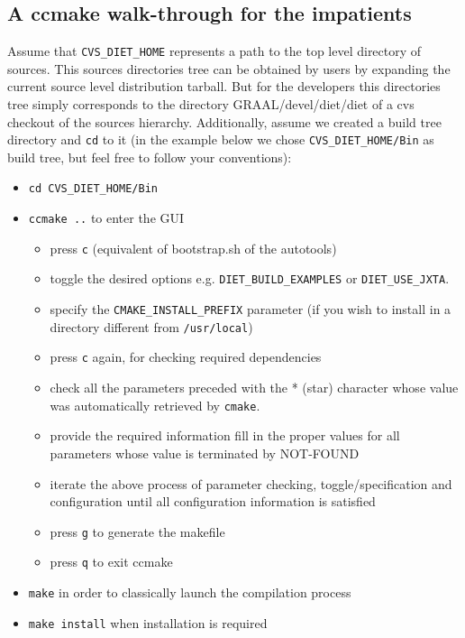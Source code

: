 \subsection{A ccmake walk-through for the impatients}

Assume that \verb+CVS_DIET_HOME+ represents a path to the top level directory
of \diet sources.  This \diet sources directories tree can be obtained by \diet
users by expanding the \diet current source level distribution tarball. But for
the \diet developers this directories tree simply corresponds to the directory
GRAAL/devel/diet/diet of a cvs checkout of the \diet sources hierarchy.
Additionally, assume we created a build tree directory and \verb+cd+ to it (in
the example below we chose \verb+CVS_DIET_HOME/Bin+ as build tree, but feel
free to follow your conventions):
\begin{itemize}
\item
  \verb+cd CVS_DIET_HOME/Bin+
\item
  \verb+ccmake ..+ to enter the GUI
  \begin{itemize}
  \item press \verb+c+ (equivalent of bootstrap.sh of the autotools)
  \item toggle the desired options e.g. \verb+DIET_BUILD_EXAMPLES+ or
    \verb+DIET_USE_JXTA+. 
  \item specify the \verb+CMAKE_INSTALL_PREFIX+ parameter (if you wish to
    install in a directory different from \verb+/usr/local+)
  \item press \verb+c+ again, for checking required dependencies
  \item check all the parameters preceded with the * (star) character
    whose value was automatically retrieved by \verb+cmake+.
  \item provide the required information \ie fill in the proper values for all
    parameters whose value is terminated by NOT-FOUND
  \item iterate the above process of parameter checking, toggle/specification
    and configuration until all configuration information is satisfied
  \item press \verb+g+ to generate the makefile
  \item press \verb+q+ to exit ccmake
  \end{itemize}
\item
  \verb+make+ in order to classically launch the compilation process
\item
  \verb+make install+ when installation is required
\end{itemize}

